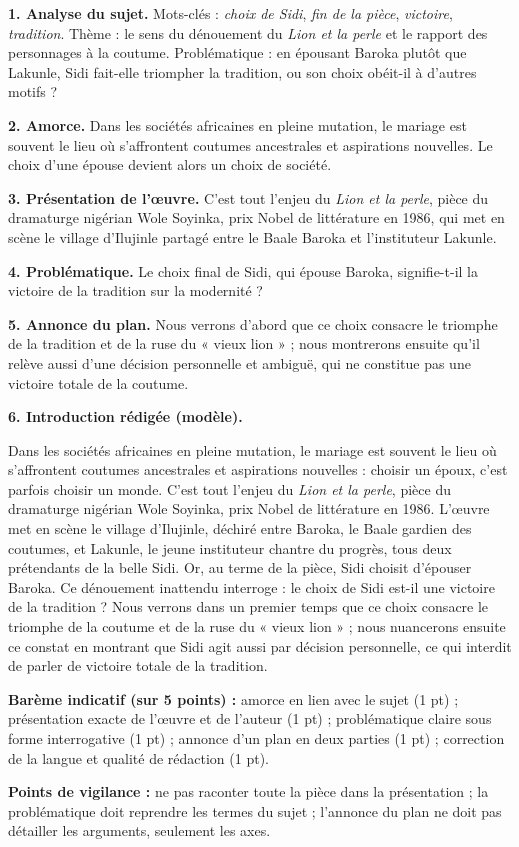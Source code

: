 \documentclass[11pt]{article}
\newcounter{popsec}
\newcounter{popsub}
\newcommand{\courssub}[1]{%
  \stepcounter{popsub}%
  \par\vspace{9pt}\noindent{\popxbold\fontsize{11.5}{13}\selectfont\color{popink}{\color{poporange}\thepopsec.\thepopsub}\hspace{6pt}#1}\par\nopagebreak\vspace{4pt}
}
\begin{document}
\courssub{Je me prépare au Bac}

\begin{corrige}
\textbf{1. Analyse du sujet.} Mots-clés : \emph{choix de Sidi}, \emph{fin de la pièce}, \emph{victoire}, \emph{tradition}. Thème : le sens du dénouement du \emph{Lion et la perle} et le rapport des personnages à la coutume. Problématique : en épousant Baroka plutôt que Lakunle, Sidi fait-elle triompher la tradition, ou son choix obéit-il à d'autres motifs ?

\textbf{2. Amorce.} Dans les sociétés africaines en pleine mutation, le mariage est souvent le lieu où s'affrontent coutumes ancestrales et aspirations nouvelles. Le choix d'une épouse devient alors un choix de société.

\textbf{3. Présentation de l'œuvre.} C'est tout l'enjeu du \emph{Lion et la perle}, pièce du dramaturge nigérian Wole Soyinka, prix Nobel de littérature en 1986, qui met en scène le village d'Ilujinle partagé entre le Baale Baroka et l'instituteur Lakunle.

\textbf{4. Problématique.} Le choix final de Sidi, qui épouse Baroka, signifie-t-il la victoire de la tradition sur la modernité ?

\textbf{5. Annonce du plan.} Nous verrons d'abord que ce choix consacre le triomphe de la tradition et de la ruse du « vieux lion » ; nous montrerons ensuite qu'il relève aussi d'une décision personnelle et ambiguë, qui ne constitue pas une victoire totale de la coutume.

\textbf{6. Introduction rédigée (modèle).}

Dans les sociétés africaines en pleine mutation, le mariage est souvent le lieu où s'affrontent coutumes ancestrales et aspirations nouvelles : choisir un époux, c'est parfois choisir un monde. C'est tout l'enjeu du \emph{Lion et la perle}, pièce du dramaturge nigérian Wole Soyinka, prix Nobel de littérature en 1986. L'œuvre met en scène le village d'Ilujinle, déchiré entre Baroka, le Baale gardien des coutumes, et Lakunle, le jeune instituteur chantre du progrès, tous deux prétendants de la belle Sidi. Or, au terme de la pièce, Sidi choisit d'épouser Baroka. Ce dénouement inattendu interroge : le choix de Sidi est-il une victoire de la tradition ? Nous verrons dans un premier temps que ce choix consacre le triomphe de la coutume et de la ruse du « vieux lion » ; nous nuancerons ensuite ce constat en montrant que Sidi agit aussi par décision personnelle, ce qui interdit de parler de victoire totale de la tradition.

\textbf{Barème indicatif (sur 5 points) :} amorce en lien avec le sujet (1 pt) ; présentation exacte de l'œuvre et de l'auteur (1 pt) ; problématique claire sous forme interrogative (1 pt) ; annonce d'un plan en deux parties (1 pt) ; correction de la langue et qualité de rédaction (1 pt).

\textbf{Points de vigilance :} ne pas raconter toute la pièce dans la présentation ; la problématique doit reprendre les termes du sujet ; l'annonce du plan ne doit pas détailler les arguments, seulement les axes.
\end{corrige}
\end{document}

